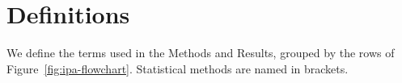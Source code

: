 
\newenvironment{ipadefs}{\small\begin{list}{}{\setlength{\leftmargin}{1.5em}\setlength{\itemindent}{-1.5em}%
  \setlength{\labelwidth}{0pt}\setlength{\itemsep}{0.4ex plus 0.3ex}%
  \setlength{\parsep}{0.4ex plus 0.2ex}\setlength{\emergencystretch}{1.5em}}}{\end{list}}

\section*{Definitions}
We define the terms used in the Methods and Results, grouped by the rows of Figure~\ref{fig:ipa-flowchart}. Statistical methods are named in brackets.

